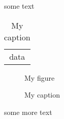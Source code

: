 \documentclass{article}
\begin{document}
	some text

\begin{table}
  	\caption{My caption}
	\begin{tabular}{c}
		data
	\end{tabular}
\end{table}

\begin{figure}
	\centering
	My figure
  	\caption{My caption}
\end{figure}
		
some more text
\end{document}
